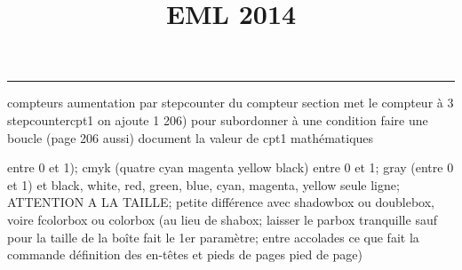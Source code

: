 \documentclass[11pt]{article}%
\title{\bf \vspace{-2cm} EML 2014} %
\author{} %
\date{} %
\renewcommand{\headrulewidth}{0pt}%
\renewcommand{\footrulewidth}{0.4pt}%
\begin{document}
\maketitle %
\vspace{-1.4cm}\hrule %
\thispagestyle{fancy}

\vspace*{.2cm}



compteurs%
aumentation par stepcounter du compteur section%
met le compteur à 3%
stepcounter{cpt1} on ajoute 1%
206) pour subordonner à une condition %
faire une boucle (page 206 aussi) %
document la valeur de cpt1 
mathématiques\newcommand{\ch}{\operatorname{ch}} 
\newcommand{\sh}{\operatorname{sh}}
\renewcommand{\tanh}{\operatorname{th}}
\renewcommand{\sinh}{\operatorname{sh}}
\renewcommand{\cosh}{\operatorname{ch}}
\newcommand{\argsh}{\operatorname{argsh}}
\newcommand{\argch}{\operatorname{argch}}
\newcommand{\argth}{\operatorname{argth}}
\newcommand{\Id}{\operatorname{Id}}
\newcommand{\id}{\operatorname{id}}
\renewcommand{\im}{\operatorname{Im}}
\renewcommand{\leq}{\leq}
\renewcommand{\geq}{\geq }

\newcommand{\dlim}{\lim}
\newcommand{\dsum}{\sum\limits}
\newcommand{\dprod}{\prod}
\newcommand{\lb}{\llbracket}
\newcommand{\rb}{\rrbracket}


entre 0 et 1); cmyk (quatre cyan magenta yellow black) entre 0 et 1;
gray (entre 0 et 1) et black, white, red, green, blue, cyan, magenta,
yellow%
seule ligne; ATTENTION A LA TAILLE; petite différence avec shadowbox ou
doublebox, voire fcolorbox ou colorbox (au lieu de shabox; laisser le
parbox tranquille sauf pour la taille de la boîte
\newcommand{\Tbox}[1]{\begin{center} \shabox{\parbox{0.8
\linewidth}{#1}} \end{center}} %
fait le 1er paramètre; entre accolades ce que fait la commande
définition des en-têtes et pieds de pages\pagestyle{fancy}
\chead{}
\rfoot[ \ \thepage]{\thepage}
\cfoot{}
\lfoot{}
\thispagestyle{fancy} %
pied de page)\renewcommand{\footrulewidth}{0.4pt}
\renewcommand{\headrulewidth}{0.4pt}
\end{document}
